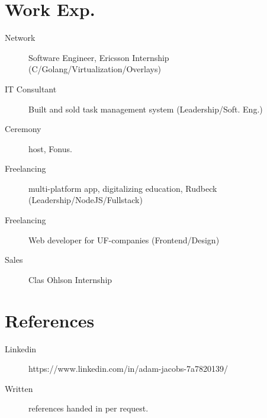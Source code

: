 \documentclass[margin,line,a4paper]{resume}
\begin{document}
\begin{resume}
\section{\mysidestyle Work Exp.}\vspace{1mm}
\begin{description}
    \item[Network] Software Engineer, Ericsson Internship (C/Golang/Virtualization/Overlays)
    \item[IT Consultant] Built and sold task management system (Leadership/Soft. Eng.)
    \item[Ceremony] host, Fonus.
    \item[Freelancing] multi-platform app, digitalizing education, Rudbeck (Leadership/NodeJS/Fullstack)
    \item[Freelancing] Web developer for UF-companies (Frontend/Design)
    \item[Sales] Clas Ohlson Internship
\end{description}


\section{\mysidestyle References}
\begin{description}
    \item[Linkedin] https://www.linkedin.com/in/adam-jacobs-7a7820139/
    \item[Written] references handed in per request.
\end{description}

\end{resume}
\end{document}
